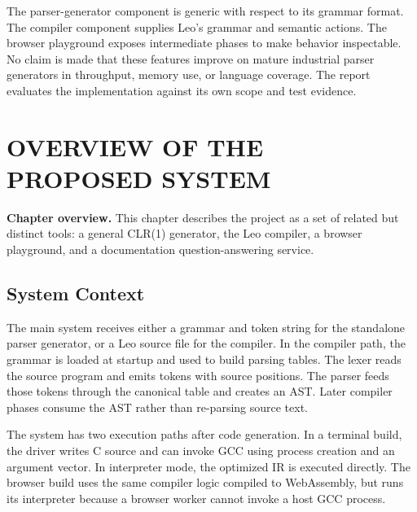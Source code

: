 \documentclass[12pt,a4paper,oneside]{report}
\newcommand{\chapterintro}[1]{\noindent\textbf{Chapter overview.} #1\par\vspace{8pt}}
\begin{document}
The parser-generator component is generic with respect to its grammar format. The compiler component supplies Leo's grammar and semantic actions. The browser playground exposes intermediate phases to make behavior inspectable. No claim is made that these features improve on mature industrial parser generators in throughput, memory use, or language coverage. The report evaluates the implementation against its own scope and test evidence.

\chapter{OVERVIEW OF THE PROPOSED SYSTEM}
\chapterintro{This chapter describes the project as a set of related but distinct tools: a general CLR(1) generator, the Leo compiler, a browser playground, and a documentation question-answering service.}

\section{System Context}
The main system receives either a grammar and token string for the standalone parser generator, or a Leo source file for the compiler. In the compiler path, the grammar is loaded at startup and used to build parsing tables. The lexer reads the source program and emits tokens with source positions. The parser feeds those tokens through the canonical table and creates an AST. Later compiler phases consume the AST rather than re-parsing source text.

The system has two execution paths after code generation. In a terminal build, the driver writes C source and can invoke GCC using process creation and an argument vector. In interpreter mode, the optimized IR is executed directly. The browser build uses the same compiler logic compiled to WebAssembly, but runs its interpreter because a browser worker cannot invoke a host GCC process.
\end{document}
